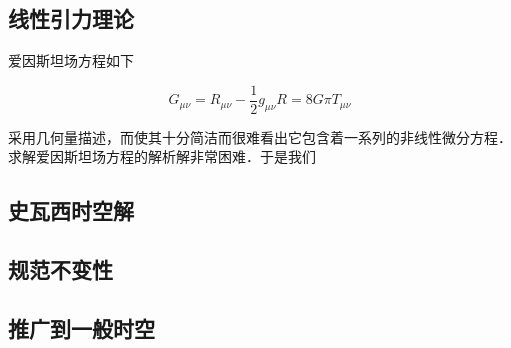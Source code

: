 
\begin{issues}
\issueMissDepend
\issueDraft
\end{issues}



\subsection{线性引力理论}
爱因斯坦场方程如下

\begin{equation}
G_{\mu \nu} = R_{\mu \nu} - \frac{1}{2}g_{\mu\nu}R = 8 G\pi T_{\mu\nu}
\end{equation}

采用几何量描述，而使其十分简洁而很难看出它包含着一系列的非线性微分方程．求解爱因斯坦场方程的解析解非常困难．于是我们




\subsection{史瓦西时空解}




\subsection{规范不变性}


\subsection{推广到一般时空}

